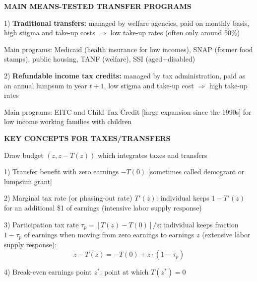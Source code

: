 \documentclass[landscape]{slides}
\begin{document}
\begin{slide}
\begin{center}
{\bf MAIN MEANS-TESTED TRANSFER PROGRAMS}
\end{center}
1) {\bf Traditional transfers:} managed by welfare agencies, paid
on monthly basis, high stigma and take-up costs $\Rightarrow$ low
take-up rates (often only around 50\%)

Main programs: Medicaid (health insurance for low incomes), SNAP
(former food stamps), public housing, TANF (welfare), SSI
(aged+disabled)

2) {\bf Refundable income tax credits:} managed by tax
administration, paid as an annual lumpsum in year $t+1$, low
stigma and take-up cost $\Rightarrow$  high take-up rates

Main programs: EITC and Child Tax Credit [large expansion since
the 1990s] for low income working families with children
\end{slide}

%
%
%



\begin{slide}
\begin{center}
{\bf KEY CONCEPTS FOR TAXES/TRANSFERS}
\end{center}
Draw budget $(z,z-T(z))$ which integrates taxes and transfers

1) Transfer benefit with zero earnings $-T(0)$ [sometimes called
demogrant or lumpsum grant]

2) Marginal tax rate (or phasing-out rate) $T'(z)$: individual
keeps $1-T'(z)$ for an additional \$1 of earnings (intensive labor
supply response)

3) Participation tax rate $\tau_p=[T(z)-T(0)]/z$: individual keeps
fraction $1-\tau_p$ of earnings when moving from zero earnings to
earnings $z$ (extensive labor supply response): 
\[ z-T(z)=-T(0) + z \cdot
(1-\tau_p) \] 

4) Break-even earnings point $z^*$: point at which $T(z^*)=0$
\end{slide}
\end{document}
